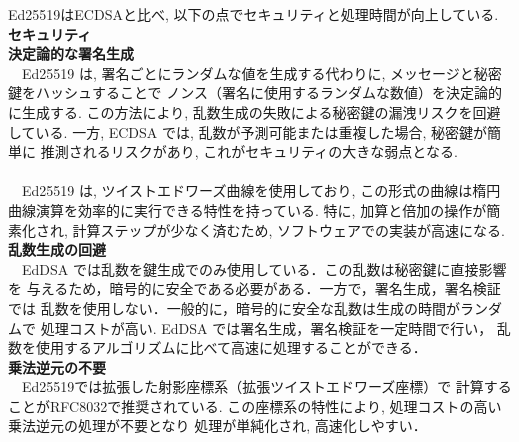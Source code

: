 Ed25519はECDSAと比べ, 以下の点でセキュリティと処理時間が向上している.\\[1em]
{\large\textbf{セキュリティ}}\\[1em]
\noindent\textbf{決定論的な署名生成}\\
　Ed25519 は, 署名ごとにランダムな値を生成する代わりに, 
メッセージと秘密鍵をハッシュすることで 
ノンス（署名に使用するランダムな数値）を決定論的に生成する.
この方法により, 乱数生成の失敗による秘密鍵の漏洩リスクを回避している.
一方, ECDSA では, 乱数が予測可能または重複した場合, 秘密鍵が簡単に
推測されるリスクがあり, これがセキュリティの大きな弱点となる.\\[1em]
\\[1em]
　Ed25519 は, ツイストエドワーズ曲線を使用しており, 
この形式の曲線は楕円曲線演算を効率的に実行できる特性を持っている.
特に, 加算と倍加の操作が簡素化され, 計算ステップが少なく済むため, 
ソフトウェアでの実装が高速になる.\\

\noindent\textbf{乱数生成の回避} \leavevmode\\
　EdDSA では乱数を鍵生成でのみ使用している．この乱数は秘密鍵に直接影響を
与えるため，暗号的に安全である必要がある．一方で，署名生成，署名検証では
乱数を使用しない．一般的に，暗号的に安全な乱数は生成の時間がランダムで
処理コストが高い. EdDSA では署名生成，署名検証を一定時間で行い，
乱数を使用するアルゴリズムに比べて高速に処理することができる．\\

\noindent\textbf{乗法逆元の不要} \leavevmode\\
　Ed25519では拡張した射影座標系（拡張ツイストエドワーズ座標）で
計算することがRFC8032で推奨されている.
この座標系の特性により, 処理コストの高い乗法逆元の処理が不要となり
処理が単純化され, 高速化しやすい．

